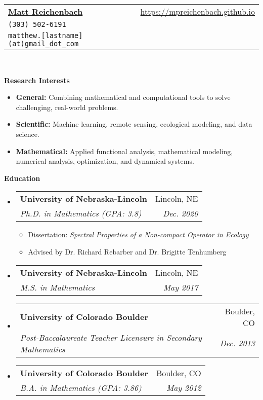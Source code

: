 \documentclass[letterpaper,11pt]{article}
\makeatletter
\newcommand{\resitem}[1]{\item #1 \vspace{-2pt}}
\newcommand{\resheading}[1]{{\large \colorbox{mygrey}{\begin{minipage}{\textwidth}{\textbf{#1 \vphantom{p\^{E}}}}\end{minipage}}}}
\newcommand{\ressubheading}[4]{
\begin{tabular*}{6.5in}{l@{\extracolsep{\fill}}r}
		\textbf{#1} & #2 \\
		\textit{#3} & \textit{#4} \\
\end{tabular*}\vspace{-6pt}}
\makeatother
\begin{document}
\thispagestyle{empty}
\newcommand{\mywebheader}{
\begin{tabular*}{7in}{l@{\extracolsep{\fill}}r}
	\textbf{\href{}{\LARGE Matt Reichenbach}} & \url{https://mpreichenbach.github.io} \\
    \texttt{(303) 502-6191} \\
    \texttt{matthew.[lastname](at)gmail\_dot\_com} \\
	\end{tabular*}
\\
\vspace{0.1in}}

\mywebheader

\resheading{Research Interests}
\begin{itemize}
	\resitem{\textbf{General:} Combining mathematical and computational tools to solve challenging, real-world problems.}
	
	\resitem{\textbf{Scientific:} Machine learning, remote sensing, ecological modeling, and data science.}
	
	\resitem{\textbf{Mathematical:} Applied functional analysis, mathematical modeling, numerical analysis, optimization, and dynamical systems.}
\end{itemize}

\resheading{Education}
	\begin{itemize}
		\item
			\ressubheading{University of Nebraska-Lincoln}{Lincoln, NE}{Ph.D. in Mathematics (GPA: 3.8)}{Dec. 2020}
				{ \footnotesize
				\begin{itemize}
					\resitem{Dissertation: \emph{Spectral Properties of a Non-compact Operator in Ecology}}
					\resitem{Advised by Dr. Richard Rebarber and Dr. Brigitte Tenhumberg}
				\end{itemize}}
		\item
		    	\ressubheading{University of Nebraska-Lincoln}{Lincoln, NE}{M.S. in Mathematics}{May 2017}
		\item
			\ressubheading{University of Colorado Boulder}{Boulder, CO}{Post-Baccalaureate Teacher Licensure in Secondary Mathematics}{Dec. 2013}
		\item
			\ressubheading{University of Colorado Boulder}{Boulder, CO}{B.A. in Mathematics (GPA: 3.86)}{May 2012}
			
	\end{itemize}
\end{document}
